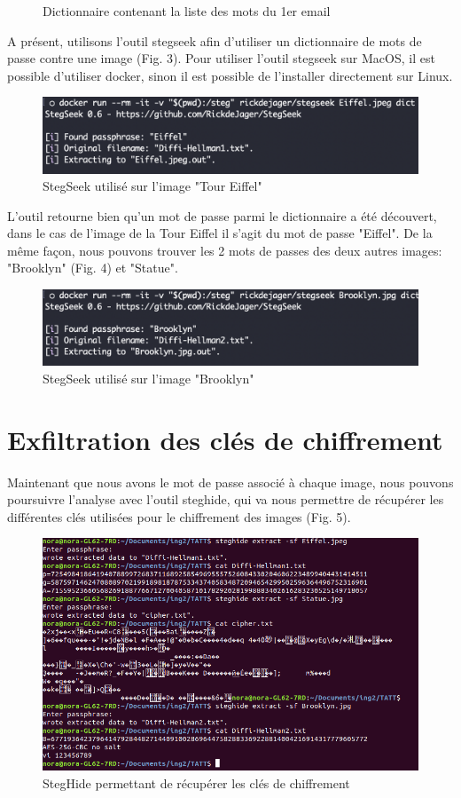 \documentclass[12pt, oneside]{article}
\begin{document}
\begin{figure}[ht]
\caption{Dictionnaire contenant la liste des mots du 1er email}
\end{figure}
A présent, utilisons l'outil stegseek afin d'utiliser un dictionnaire de mots de passe contre une image (Fig. 3). Pour utiliser l'outil stegseek sur MacOS, il est possible d'utiliser docker, sinon il est possible de l'installer directement sur Linux. 
\begin{figure}[ht]
\centering
\includegraphics[scale=0.4]{eiffel}
\caption{StegSeek utilisé sur l'image "Tour Eiffel"}
\end{figure}
L'outil retourne bien qu'un mot de passe parmi le dictionnaire a été découvert, dans le cas de l'image de la Tour Eiffel il s'agit du mot de passe "Eiffel". 
De la même façon, nous pouvons trouver les 2 mots de passes des deux autres images: "Brooklyn" (Fig. 4) et "Statue".
\begin{figure}[ht]
\centering
\includegraphics[scale=0.4]{brooklyn}
\caption{StegSeek utilisé sur l'image "Brooklyn"}
\end{figure}

\section{Exfiltration des clés de chiffrement}
Maintenant que nous avons le mot de passe associé à chaque image, nous pouvons poursuivre l'analyse avec l'outil steghide, qui va nous permettre de récupérer les différentes clés utilisées pour le chiffrement des images (Fig. 5). 

\begin{figure}[ht]
\centering
\includegraphics[scale=0.4]{steghide}
\caption{StegHide permettant de récupérer les clés de chiffrement}
\end{figure}
\end{document}
